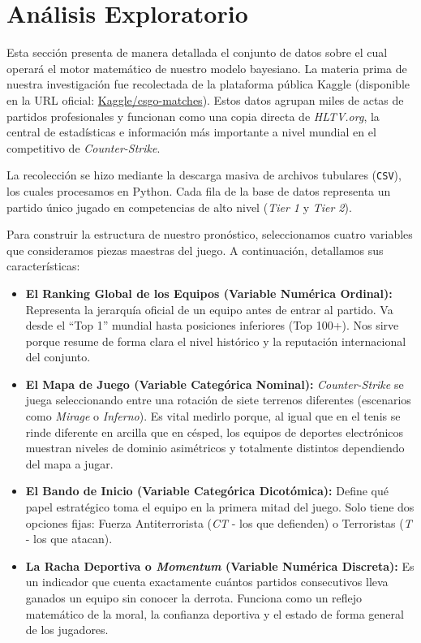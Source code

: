 \documentclass[twocolumn,10pt]{article}
\begin{document}
\section{Análisis Exploratorio}
Esta sección presenta de manera detallada el conjunto de datos sobre el cual operará el motor matemático de nuestro modelo bayesiano. La materia prima de nuestra investigación fue recolectada de la plataforma pública Kaggle (disponible en la URL oficial: \href{https://www.kaggle.com/datasets/mateusdmachado/csgo-professional-matches}{Kaggle/csgo-matches}). Estos datos agrupan miles de actas de partidos profesionales y funcionan como una copia directa de \textit{HLTV.org}, la central de estadísticas e información más importante a nivel mundial en el competitivo de \textit{Counter-Strike}.

La recolección se hizo mediante la descarga masiva de archivos tubulares (\texttt{CSV}), los cuales procesamos en Python. Cada fila de la base de datos representa un partido único jugado en competencias de alto nivel (\textit{Tier 1} y \textit{Tier 2}).

Para construir la estructura de nuestro pronóstico, seleccionamos cuatro variables que consideramos piezas maestras del juego. A continuación, detallamos sus características:
\begin{itemize}
    \item \textbf{El Ranking Global de los Equipos (Variable Numérica Ordinal):} Representa la jerarquía oficial de un equipo antes de entrar al partido. Va desde el ``Top 1'' mundial hasta posiciones inferiores (Top 100+). Nos sirve porque resume de forma clara el nivel histórico y la reputación internacional del conjunto.
    \item \textbf{El Mapa de Juego (Variable Categórica Nominal):} \textit{Counter-Strike} se juega seleccionando entre una rotación de siete terrenos diferentes (escenarios como \textit{Mirage} o \textit{Inferno}). Es vital medirlo porque, al igual que en el tenis se rinde diferente en arcilla que en césped, los equipos de deportes electrónicos muestran niveles de dominio asimétricos y totalmente distintos dependiendo del mapa a jugar.
    \item \textbf{El Bando de Inicio (Variable Categórica Dicotómica):} Define qué papel estratégico toma el equipo en la primera mitad del juego. Solo tiene dos opciones fijas: Fuerza Antiterrorista (\textit{CT} - los que defienden) o Terroristas (\textit{T} - los que atacan). 
    \item \textbf{La Racha Deportiva o \textit{Momentum} (Variable Numérica Discreta):} Es un indicador que cuenta exactamente cuántos partidos consecutivos lleva ganados un equipo sin conocer la derrota. Funciona como un reflejo matemático de la moral, la confianza deportiva y el estado de forma general de los jugadores.
\end{itemize}
\end{document}
